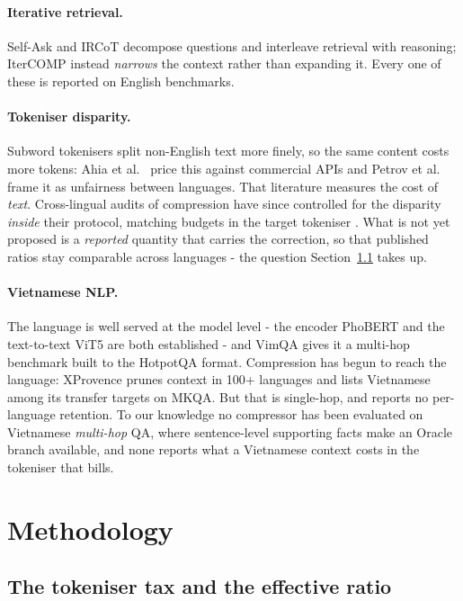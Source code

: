 \documentclass{llncs}
\begin{document}
\paragraph{Iterative retrieval.} Self-Ask \cite{press2023selfask} and IRCoT
\cite{trivedi2023ircot} decompose questions and interleave retrieval with
reasoning; IterCOMP instead \emph{narrows} the context rather than expanding it.
Every one of these is reported on English benchmarks.

\paragraph{Tokeniser disparity.} Subword tokenisers split non-English text more
finely, so the same content costs more tokens: Ahia et al.\
\cite{ahia2023allcost} price this against commercial APIs and Petrov et al.\
\cite{petrov2023tokenizers} frame it as unfairness between languages. That
literature measures the cost of \emph{text}. Cross-lingual audits of compression
have since controlled for the disparity \emph{inside} their protocol, matching
budgets in the target tokeniser \cite{lukauskas2026lost}. What is not yet
proposed is a \emph{reported} quantity that carries the correction, so that
published ratios stay comparable across languages - the question
Section~\ref{sec:fertility} takes up.

\paragraph{Vietnamese NLP.} The language is well served at the model level -
the encoder PhoBERT \cite{nguyen2020phobert} and the text-to-text ViT5
\cite{phan2022vit5} are both established - and VimQA \cite{le2022vimqa} gives it a
multi-hop benchmark built to
the HotpotQA format. Compression has begun to reach the language: XProvence
\cite{mohamed2026xprovence} prunes context in 100+ languages and lists Vietnamese
among its transfer targets on MKQA. But that is single-hop, and reports no
per-language retention. To our knowledge no compressor has been evaluated on
Vietnamese \emph{multi-hop} QA, where sentence-level supporting facts make an
Oracle branch available, and none reports what a Vietnamese context costs in the
tokeniser that bills.

\section{Methodology}
\label{sec:methodology}

\subsection{The tokeniser tax and the effective ratio}
\label{sec:fertility}
\end{document}

